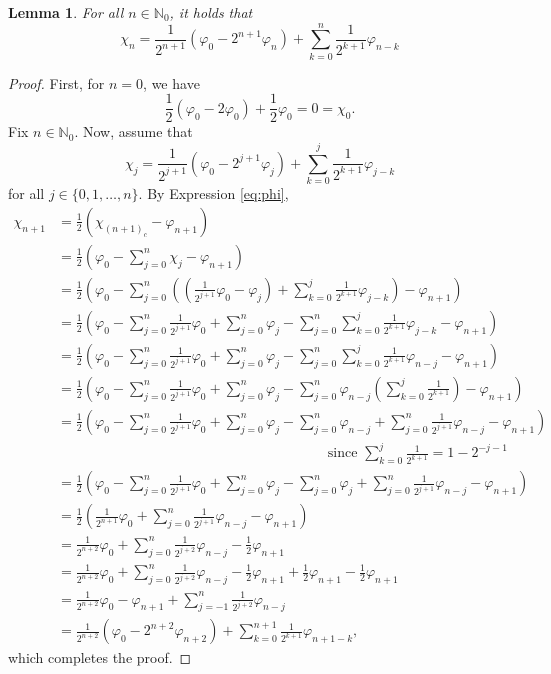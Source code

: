 \documentclass[]{amsart}
\newcommand{\ninnz}{n \in \N_0 }
\newcommand{\vhi}{{\varphi}}
\newcommand{\N}{{\mathds{N}}}
\theoremstyle{plain}
\newtheorem{lemma}[theorem]{Lemma}
\theoremstyle{definition}
\theoremstyle{remark}
\numberwithin{equation}{section}
\begin{document}
\begin{lemma}\label{l:chi-vhi}
For all $\ninnz$, it holds that 
\[
\chi_n=\frac{1}{2^{n+1}}(\vhi_0-2^{n+1}\vhi_n)+\sum_{k=0}^{n}\frac{1}{2^{k+1}}\vhi_{n-k}
\]
\end{lemma}
\begin{proof}
First, for $n=0$, we have
\[
\frac{1}{2}(\vhi_0-2\vhi_0)+\frac{1}{2}\vhi_0=0=\chi_0.
\]
Fix $\ninnz$. Now, assume that \[\chi_j=\frac{1}{2^{j+1}}(\vhi_0-2^{j+1}\vhi_j)+\sum_{k=0}^{j}\frac{1}{2^{k+1}}\vhi_{j-k}\]
 for all $j \in \{0, 1, \ldots, n\}.$ By Expression \eqref{eq:phi}, 
 \begin{align*}
      \chi_{n+1}&=\frac{1}{2}\left(\chi_{(n+1)_c}-\vhi_{n+1}\right)\\
      &=\frac{1}{2}\left(\vhi_0 - \sum_{j=0}^{n}\chi_j -\vhi_{n+1}\right)\\
      &=\frac{1}{2}\left(\vhi_0 - \sum_{j=0}^{n}\left( \left(\frac{1}{2^{j+1}} \vhi_0-\vhi_j\right)+\sum_{k=0}^{j}\frac{1}{2^{k+1}}\vhi_{j-k}\right)  -\vhi_{n+1}\right)\\
      &=\frac{1}{2}\left(\vhi_0 - \sum_{j=0}^{n} \frac{1}{2^{j+1}}\vhi_0+\sum_{j=0}^{n}\vhi_j-\sum_{j=0}^{n}\sum_{k=0}^{j}\frac{1}{2^{k+1}}\vhi_{j-k}  -\vhi_{n+1}\right)\\
      &=\frac{1}{2}\left(\vhi_0 - \sum_{j=0}^{n} \frac{1}{2^{j+1}}\vhi_0+\sum_{j=0}^{n}\vhi_j-\sum_{j=0}^{n}\sum_{k=0}^{j}\frac{1}{2^{k+1}}\vhi_{n-j}  -\vhi_{n+1}\right)\\
      &=\frac{1}{2}\left(\vhi_0 - \sum_{j=0}^{n} \frac{1}{2^{j+1}}\vhi_0+\sum_{j=0}^{n}\vhi_j-\sum_{j=0}^{n}\vhi_{n-j}\left(\sum_{k=0}^{j}\frac{1}{2^{k+1}}\right)  -\vhi_{n+1}\right)\\
      &=\frac{1}{2}\left(\vhi_0 - \sum_{j=0}^{n} \frac{1}{2^{j+1}}\vhi_0+\sum_{j=0}^{n}\vhi_j-\sum_{j=0}^{n}\vhi_{n-j} + \sum_{j=0}^{n}\frac{1}{2^{j+1}}\vhi_{n-j}  -\vhi_{n+1}\right)\\
      & \quad \quad \quad \quad \quad \quad \quad \quad \quad \quad \quad   \quad \quad \quad \quad \quad \quad \quad \quad \text{ since $\sum_{k=0}^{j}\frac{1}{2^{k+1}}=1-2^{-j-1}$} \\
     &=\frac{1}{2}\left(\vhi_0 - \sum_{j=0}^{n} \frac{1}{2^{j+1}}\vhi_0+\sum_{j=0}^{n}\vhi_j-\sum_{j=0}^{n}\vhi_{j} + \sum_{j=0}^{n}\frac{1}{2^{j+1}}\vhi_{n-j}  -\vhi_{n+1}\right)   \\
     &=\frac{1}{2}\left(\frac{1}{2^{n+1}}\vhi_0  + \sum_{j=0}^{n}\frac{1}{2^{j+1}}\vhi_{n-j}  -\vhi_{n+1}\right)   \\
     &=\frac{1}{2^{n+2}}\vhi_0  + \sum_{j=0}^{n}\frac{1}{2^{j+2}}\vhi_{n-j}  -\frac{1}{2}\vhi_{n+1} \\
     &=\frac{1}{2^{n+2}}\vhi_0  + \sum_{j=0}^{n}\frac{1}{2^{j+2}}\vhi_{n-j}  -\frac{1}{2}\vhi_{n+1} +\frac{1}{2}\vhi_{n+1} -\frac{1}{2}\vhi_{n+1} \\
     &=\frac{1}{2^{n+2}}\vhi_0  - \vhi_{n+1} + \sum_{j=-1}^{n}\frac{1}{2^{j+2}}\vhi_{n-j} \\
     &=\frac{1}{2^{n+2}}\left(\vhi_0  - 2^{n+2}\vhi_{n+2}\right) + \sum_{k=0}^{n+1}\frac{1}{2^{k+1}}\vhi_{n+1-k} ,   
 \end{align*}
 which completes the proof.
\end{proof}
\end{document}

